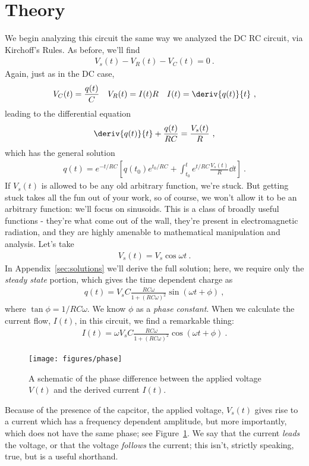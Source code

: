\documentclass[12pt]{article}
\begin{document}
\section{Theory}
\label{sec:theory}

We begin analyzing this circuit the same way we analyzed the DC RC
circuit, via Kirchoff's Rules.  As before, we'll find
\begin{gather*}
  V_s(t) - V_R(t) - V_C(t) = 0\ .
\end{gather*}
Again, just as in the DC case,
\begin{align*}
  V_C(t) &= \frac{q(t)}{C} & V_R(t) &= I(t) R & I(t) =
  \deriv{q(t)}{t}\ ,
\end{align*}
leading to the differential equation
\begin{gather*}
  \deriv{q(t)}{t} + \frac{q(t)}{RC} = \frac{V_s(t)}{R}\ ,
\end{gather*}
which has the general solution
\begin{gather*}
  q(t) = e^{-t/RC} \left[ 
    q(t_0) e^{t_0/RC} + \int_{t_0}^t e^{t/RC} \frac{V_s(t)}{R} \dd t
\right]\ .
\end{gather*}
If $V_s(t)$ is allowed to be any old arbitrary function, we're stuck.
But getting stuck takes all the fun out of your work, so of course, we
won't allow it to be an arbitrary function: we'll focus on sinusoids.
This is a class of broadly useful functions - they're what come out of
the wall, they're present in electromagnetic radiation, and they are
highly amenable to mathematical manipulation and analysis.  Let's take 
\begin{gather*}
  V_s(t) = V_s \cos \omega t\ .
\end{gather*}
In Appendix~\ref{sec:solutions} we'll derive the full solution; here,
we require only the \textit{steady state} portion, which gives the
time dependent charge as
\begin{gather*}
  q(t) = V_s C \frac{RC\omega}{1+(RC\omega)^2} \sin( \omega t + \phi)\ ,
\end{gather*}
where $\tan \phi = 1/RC\omega$.  We know $\phi$ as a \textit{phase
  constant}.  When we calculate the current flow, $I(t)$, in this
circuit, we find a remarkable thing:
\begin{gather*}
  I(t) = \omega V_s C \frac{RC\omega}{1+(RC\omega)^2} \cos( \omega t +
  \phi)\ .
\end{gather*}
\begin{figure}
  \centering
  \texttt{[image: figures/phase]}
  \caption{A schematic of the phase difference between the applied
    voltage $V(t)$ and the derived current $I(t)$.}
  \label{fig:phase}
\end{figure}
Because of the presence of the capcitor, the applied voltage, $V_s(t)$
gives rise to a current which has a frequency dependent amplitude, but
more importantly, which does not have the same phase; see
Figure~\ref{fig:phase}.  We say that the current \textit{leads} the
voltage, or that the voltage \textit{follows} the current; this isn't,
strictly speaking, true, but is a useful shorthand.
\end{document}

